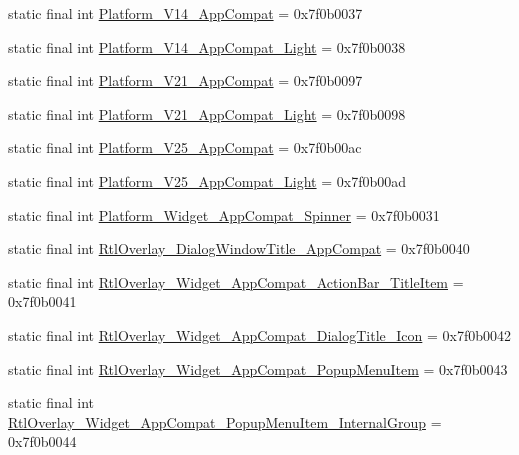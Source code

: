 \begin{CompactItemize}
\item 
static final int \hyperlink{classandroid_1_1support_1_1v7_1_1cardview_1_1_r_1_1style_cb82cb369a757d717038b44ad82183cc}{Platform\_\-V14\_\-AppCompat} = 0x7f0b0037
\item 
static final int \hyperlink{classandroid_1_1support_1_1v7_1_1cardview_1_1_r_1_1style_7d4efc7710387c67c12b5252dc6119c2}{Platform\_\-V14\_\-AppCompat\_\-Light} = 0x7f0b0038
\item 
static final int \hyperlink{classandroid_1_1support_1_1v7_1_1cardview_1_1_r_1_1style_7bbb4e0283ed3b4e463a38570e090e68}{Platform\_\-V21\_\-AppCompat} = 0x7f0b0097
\item 
static final int \hyperlink{classandroid_1_1support_1_1v7_1_1cardview_1_1_r_1_1style_45655423eab9e964177eb8ac400db07e}{Platform\_\-V21\_\-AppCompat\_\-Light} = 0x7f0b0098
\item 
static final int \hyperlink{classandroid_1_1support_1_1v7_1_1cardview_1_1_r_1_1style_941750954a90de240fdaa42229a80316}{Platform\_\-V25\_\-AppCompat} = 0x7f0b00ac
\item 
static final int \hyperlink{classandroid_1_1support_1_1v7_1_1cardview_1_1_r_1_1style_cf9cf7a29190e8b2e467659e4e80a038}{Platform\_\-V25\_\-AppCompat\_\-Light} = 0x7f0b00ad
\item 
static final int \hyperlink{classandroid_1_1support_1_1v7_1_1cardview_1_1_r_1_1style_b8625e198745222d0446448f6432aba1}{Platform\_\-Widget\_\-AppCompat\_\-Spinner} = 0x7f0b0031
\item 
static final int \hyperlink{classandroid_1_1support_1_1v7_1_1cardview_1_1_r_1_1style_cbab91bfb70d73ab43121c40703eb741}{RtlOverlay\_\-DialogWindowTitle\_\-AppCompat} = 0x7f0b0040
\item 
static final int \hyperlink{classandroid_1_1support_1_1v7_1_1cardview_1_1_r_1_1style_554af18c64e9da764b08dfc7c3ca5064}{RtlOverlay\_\-Widget\_\-AppCompat\_\-ActionBar\_\-TitleItem} = 0x7f0b0041
\item 
static final int \hyperlink{classandroid_1_1support_1_1v7_1_1cardview_1_1_r_1_1style_3fa90206c39b43447f54b562b87e484b}{RtlOverlay\_\-Widget\_\-AppCompat\_\-DialogTitle\_\-Icon} = 0x7f0b0042
\item 
static final int \hyperlink{classandroid_1_1support_1_1v7_1_1cardview_1_1_r_1_1style_957c9724173edaddc1391e7254d0290f}{RtlOverlay\_\-Widget\_\-AppCompat\_\-PopupMenuItem} = 0x7f0b0043
\item 
static final int \hyperlink{classandroid_1_1support_1_1v7_1_1cardview_1_1_r_1_1style_4a66ff37af91b9de634b6569e3b6cdec}{RtlOverlay\_\-Widget\_\-AppCompat\_\-PopupMenuItem\_\-InternalGroup} = 0x7f0b0044

\end{CompactItemize}
